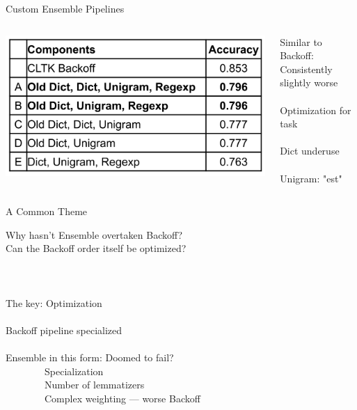 \documentclass[aspectratio=169,xcolor=dvipsnames]{beamer}
\begin{document}
\begin{frame}{Custom Ensemble Pipelines}
\ \\
 \begin{columns}
        \begin{column}{0.55\textwidth}
    \includegraphics[width=1\textwidth]{ensemble_performances_v2.png}
        \end{column}
        \begin{column}{0.4\textwidth}
            Similar to Backoff: Consistently slightly worse \\ \ \\
            Optimization for task \\ \ \\
            Dict underuse \\ \ \\
            Unigram: "est" \rightarrow{} 
        \end{column}
    \end{columns} 

    
\end{frame}

\begin{frame}[t]{A Common Theme}

    \Large{Why hasn't Ensemble overtaken Backoff?}\\
    \large
    Can the Backoff order itself be optimized? \\ \ \\ \ \\ \ \\
    \normalsize 
    The key: Optimization \\ \ \\
    Backoff pipeline specialized \\ \ \\
    Ensemble in this form: Doomed to fail? \\
    \ \ \ \ \ \ \ \  Specialization\\
    \ \ \ \ \ \ \ \      Number of lemmatizers \\

    \ \ \ \ \ \ \ \      Complex weighting --- worse Backoff
\end{frame}
\end{document}
